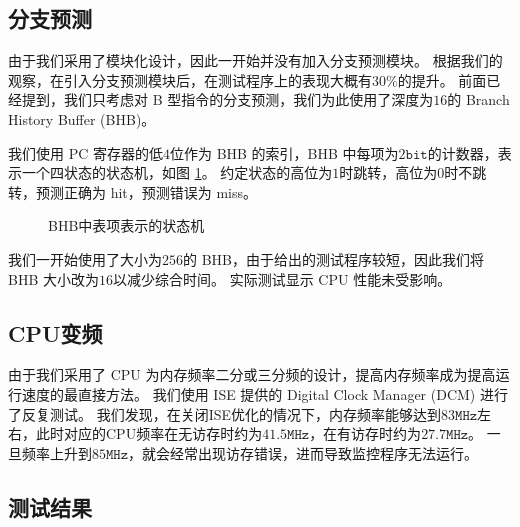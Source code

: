 \documentclass{article}
\begin{document}
\subsection{分支预测}\label{sec:branch-prediction}

由于我们采用了模块化设计，因此一开始并没有加入分支预测模块。
根据我们的观察，在引入分支预测模块后，在测试程序上的表现大概有$30\%$的提升。
前面已经提到，我们只考虑对 B 型指令的分支预测，我们为此使用了深度为$16$的 Branch History Buffer (BHB)。

我们使用 PC 寄存器的低$4$位作为 BHB 的索引，BHB 中每项为$2\texttt{bit}$的计数器，表示一个四状态的状态机，如图 \ref{fig:counter}。
约定状态的高位为$1$时跳转，高位为$0$时不跳转，预测正确为 hit，预测错误为 miss。

\begin{figure}[ht]
\centering
{}
\caption{BHB中表项表示的状态机}
\label{fig:counter}
\end{figure}

我们一开始使用了大小为$256$的 BHB，由于给出的测试程序较短，因此我们将 BHB 大小改为$16$以减少综合时间。
实际测试显示 CPU 性能未受影响。

\subsection{CPU变频}

由于我们采用了 CPU 为内存频率二分或三分频的设计，提高内存频率成为提高运行速度的最直接方法。
我们使用 ISE 提供的 Digital Clock Manager (DCM) 进行了反复测试。
我们发现，在关闭ISE优化的情况下，内存频率能够达到$83\texttt{MHz}$左右，此时对应的CPU频率在无访存时约为$41.5\texttt{MHz}$，在有访存时约为$27.7\texttt{MHz}$。
一旦频率上升到$85\texttt{MHz}$，就会经常出现访存错误，进而导致监控程序无法运行。

\subsection{测试结果}
\end{document}
